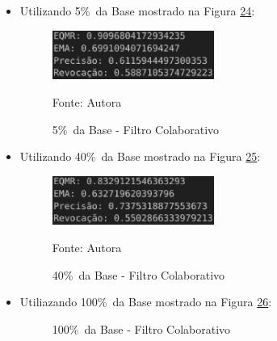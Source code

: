 \begin{itemize}
    \item Utilizando 5\%\ da Base mostrado na Figura \hyperref[fig:fc-5]{24}:
    \begin{figure}[htbp]
        \centering
        \caption{5\%\ da Base - Filtro Colaborativo}
        \label{fig:fc-5}
        
        \vspace{2pt} %
        
        \includegraphics[width=0.5\textwidth]{figuras/fc-5.eps}
        
        \vspace{2pt} %
        
        \small Fonte: Autora
    \end{figure}

    \item Utilizando 40\%\ da Base mostrado na Figura \hyperref[fig:fc-40]{25}:
    \begin{figure}[htbp]
        \centering
        \caption{40\%\ da Base - Filtro Colaborativo}
        \label{fig:fc-40}
        
        \vspace{2pt} %
        
        \includegraphics[width=0.5\textwidth]{figuras/fc-40.eps}
        
        \vspace{2pt} %
        
        \small Fonte: Autora
    \end{figure}

    \item Utiliazando 100\%\ da Base mostrado na Figura \hyperref[fig:fc-100]{26}:
    \begin{figure}[htbp]
        \centering
        \caption{100\%\ da Base - Filtro Colaborativo}
        \label{fig:fc-100}
        

\end{figure}
\end{itemize}
